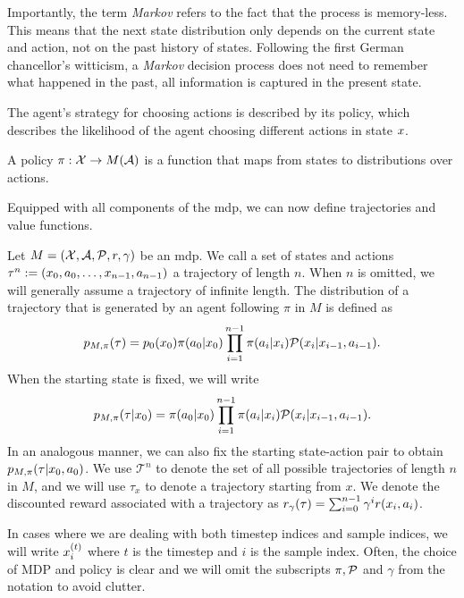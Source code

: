Importantly, the term \emph{Markov} refers to the fact that the process is memory-less.
This means that the next state distribution only depends on the current state and action, not on the past history of states.
Following the first German chancellor's witticism, a \emph{Markov} decision process does not need to remember what happened in the past, all information is captured in the present state.

The agent's strategy for choosing actions is described by its policy, which describes the likelihood of the agent choosing different actions in state $\state$.

\begin{definition}[Policy]
    A policy $\pi: \states \rightarrow M(\actions)$ is a function that maps from states to distributions over actions.
\end{definition}

Equipped with all components of the \ac{mdp}, we can now define trajectories and value functions.

\begin{definition}[Trajectories]
    Let $M = (\states,\actions,\mathcal{P},r,\gamma)$ be an \ac{mdp}.
    We call a set of states and actions $\tau^n := (\state_0,a_0,\dots,\state_{n-1},a_{n-1})$ a trajectory of length $n$.
    When $n$ is omitted, we will generally assume a trajectory of infinite length.
    The distribution of a trajectory that is generated by an agent following $\pi$ in $M$ is defined as $$p_{M, \pi}(\tau) = p_0(\state_0) \pi(a_0|\state_0) \prod_{i=1}^{n-1} \pi(a_i|\state_i) \mathcal{P}(\state_i|\state_{i-1},a_{i-1}).$$
    When the starting state is fixed, we will write $$p_{M,\pi}(\tau|\state_0) = \pi(a_0|\state_0) \prod_{i=1}^{n-1} \pi(a_i|\state_i) \mathcal{P}(\state_i|\state_{i-1},a_{i-1}).$$
    In an analogous manner, we can also fix the starting state-action pair to obtain $p_{M,\pi}(\tau|\state_0,a_0)$.
    We use $\mathcal{T}^n$ to denote the set of all possible trajectories of length $n$ in $M$, and we will use $\tau_x$ to denote a trajectory starting from $x$.
    We denote the discounted reward associated with a trajectory as $r_\gamma(\tau) = \sum_{i=0}^{n-1} \gamma^i r(\state_i,a_i)$.
\end{definition}

In cases where we are dealing with both timestep indices and sample indices, we will write $\state^{(t)}_i$ where $t$ is the timestep and $i$ is the sample index.
Often, the choice of MDP and policy is clear and we will omit the subscripts $\pi,\P$ and $\gamma$ from the notation to avoid clutter.

